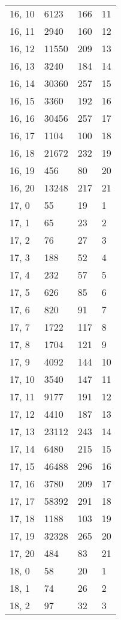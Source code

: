 \begin{table}
\begin{tabular}{llll}
16, 10 &    6123 &  166 &    11 \\
16, 11 &    2940 &  160 &    12 \\
16, 12 &   11550 &  209 &    13 \\
16, 13 &    3240 &  184 &    14 \\
16, 14 &   30360 &  257 &    15 \\
16, 15 &    3360 &  192 &    16 \\
16, 16 &   30456 &  257 &    17 \\
16, 17 &    1104 &  100 &    18 \\
16, 18 &   21672 &  232 &    19 \\
16, 19 &     456 &   80 &    20 \\
16, 20 &   13248 &  217 &    21 \\
17, 0  &      55 &   19 &     1 \\
17, 1  &      65 &   23 &     2 \\
17, 2  &      76 &   27 &     3 \\
17, 3  &     188 &   52 &     4 \\
17, 4  &     232 &   57 &     5 \\
17, 5  &     626 &   85 &     6 \\
17, 6  &     820 &   91 &     7 \\
17, 7  &    1722 &  117 &     8 \\
17, 8  &    1704 &  121 &     9 \\
17, 9  &    4092 &  144 &    10 \\
17, 10 &    3540 &  147 &    11 \\
17, 11 &    9177 &  191 &    12 \\
17, 12 &    4410 &  187 &    13 \\
17, 13 &   23112 &  243 &    14 \\
17, 14 &    6480 &  215 &    15 \\
17, 15 &   46488 &  296 &    16 \\
17, 16 &    3780 &  209 &    17 \\
17, 17 &   58392 &  291 &    18 \\
17, 18 &    1188 &  103 &    19 \\
17, 19 &   32328 &  265 &    20 \\
17, 20 &     484 &   83 &    21 \\
18, 0  &      58 &   20 &     1 \\
18, 1  &      74 &   26 &     2 \\
18, 2  &      97 &   32 &     3 \\

\end{tabular}
\end{table}
